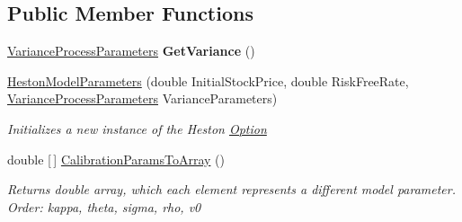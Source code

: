 \subsection*{Public Member Functions}
\begin{DoxyCompactItemize}
\item 
\mbox{\label{class_heston_model_1_1_classes_1_1_interface_classes_1_1_heston_model_parameters_a7221ed3a66dd76115e0cfef2a89b48a4}} 
\mbox{\hyperlink{class_heston_model_1_1_classes_1_1_interface_classes_1_1_variance_process_parameters}{Variance\+Process\+Parameters}} {\bfseries Get\+Variance} ()
\item 
\mbox{\hyperlink{class_heston_model_1_1_classes_1_1_interface_classes_1_1_heston_model_parameters_ae0c1de67a5daaadedaab839afc01493b}{Heston\+Model\+Parameters}} (double Initial\+Stock\+Price, double Risk\+Free\+Rate, \mbox{\hyperlink{class_heston_model_1_1_classes_1_1_interface_classes_1_1_variance_process_parameters}{Variance\+Process\+Parameters}} Variance\+Parameters)
\begin{DoxyCompactList}\small\item\em Initializes a new instance of the Heston \mbox{\hyperlink{class_heston_model_1_1_classes_1_1_interface_classes_1_1_option}{Option}} \end{DoxyCompactList}\item 
double \mbox{[}$\,$\mbox{]} \mbox{\hyperlink{class_heston_model_1_1_classes_1_1_interface_classes_1_1_heston_model_parameters_a57292eac146d8d3309bcad9f44ca0027}{Calibration\+Params\+To\+Array}} ()
\begin{DoxyCompactList}\small\item\em Returns double array, which each element represents a different model parameter. Order\+: kappa, theta, sigma, rho, v0 \end{DoxyCompactList}\end{DoxyCompactItemize}
